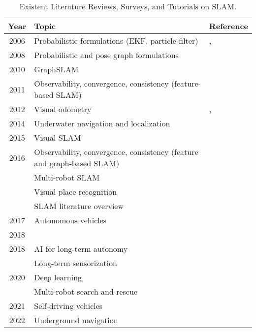\begin{table}[h]
  \caption[Existent Literature Reviews, Surveys, and Tutorials on SLAM.]{Existent Literature Reviews, Surveys, and Tutorials on SLAM.}
  \label{tab:purpose:current-literature}
  \centering
  {\scriptsize
  \begin{tabular}{c p{} p{}}

\hline
\textbf{Year} & \textbf{Topic} & \textbf{Reference}\\
\hline
2006 & Probabilistic formulations (EKF, particle filter)
     & \cite{purpose:study:durrant-whyte-bailey:2006:1}, \cite{purpose:study:durrant-whyte-bailey:2006:2}\\
\hline
2008 & Probabilistic and pose graph formulations
     & \cite{purpose:study:thrun:2008}\\
\hline
2010 & GraphSLAM
     & \cite{purpose:study:grisetti:2010}\\
\hline
2011 & Observability, convergence, consistency (feature-based SLAM)
     & \cite{purpose:study:dissanayake:2011}\\
\hline
2012 & Visual odometry
     & \cite{purpose:study:scaramuzza-fraundorfer:2011:1}, \cite{purpose:study:scaramuzza-fraundorfer:2012:2}\\
\hline
2014 & Underwater navigation and localization
     & \cite{purpose:study:paull:2014}\\
\hline
2015 & Visual SLAM
     & \cite{purpose:study:yousif:2015}\\
\hline
2016 & Observability, convergence, consistency (feature and graph-based SLAM)
     & \cite{purpose:study:huang-dissanayake:2016}\\
     & Multi-robot SLAM
     & \cite{purpose:study:saeedi:2016}\\
     & Visual place recognition
     & \cite{purpose:study:lowry:2016}\\
     & SLAM literature overview
     & \cite{purpose:study:cadena:2016}\\
\hline
2017 & Autonomous vehicles
     & \cite{purpose:study:bresson:2017}\\
\cline{1-1}
\cline{3-3}
2018 &
     & \cite{purpose:study:kuutti:2018}\\
\hline
2018 & AI for long-term autonomy
     & \cite{purpose:study:kunze:2018}\\
     & Long-term sensorization
     & \cite{purpose:study:zaffar:2018}\\
\hline
2020 & Deep learning
     & \cite{purpose:study:fayyad:2020}\\
     & Multi-robot search and rescue
     & \cite{purpose:study:queralta:2020}\\
\hline
2021 & Self-driving vehicles
     & \cite{purpose:study:badue:2021}\\
\hline
2022 & Underground navigation
     & \cite{purpose:study:ebadi}\\
\hline

  \end{tabular}}
\end{table}


